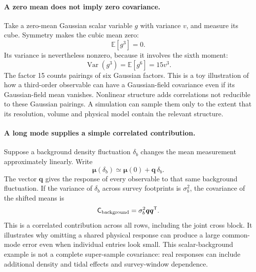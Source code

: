 \documentclass[11pt]{article}
\newcommand{\Cov}{\mathsf{C}}
\newcommand{\T}{^{\mathsf{T}}}
\newcommand{\E}{\mathbb{E}}
\newcommand{\Var}{\operatorname{Var}}
\begin{document}
\paragraph{A zero mean does not imply zero covariance.}
Take a zero-mean Gaussian scalar variable $g$ with variance $v$, and
measure its cube. Symmetry makes the cubic mean zero:
\begin{equation}
 \E[g^3]=0.
\end{equation}
Its variance is nevertheless nonzero, because it involves the sixth
moment:
\begin{equation}
 \Var(g^3)=\E[g^6]=15v^3.
\end{equation}
The factor 15 counts pairings of six Gaussian factors. This is a toy
illustration of how a third-order observable can have a Gaussian-field
covariance even if its Gaussian-field mean vanishes. Nonlinear structure
adds correlations not reducible to these Gaussian pairings. A simulation
can sample them only to the extent that its resolution, volume and physical
model contain the relevant structure.

\paragraph{A long mode supplies a simple correlated contribution.}
Suppose a background density fluctuation $\delta_b$ changes the mean
measurement approximately linearly. Write
\begin{equation}
 \boldsymbol\mu(\delta_b)
        \simeq\boldsymbol\mu(0)+\boldsymbol q\,\delta_b.
\end{equation}
The vector $\boldsymbol q$ gives the response of every observable to that
same background fluctuation. If the variance of $\delta_b$ across survey
footprints is $\sigma_b^2$, the covariance of the shifted means is
\begin{equation}
 \Cov_{\rm background}=\sigma_b^2\boldsymbol q\boldsymbol q\T.
\end{equation}
This is a correlated contribution across all rows, including the joint
cross block. It illustrates why omitting a shared physical response can
produce a large common-mode error even when individual entries look small.
This scalar-background example is not a complete super-sample covariance:
real responses can include additional density and tidal effects and
survey-window dependence.
\end{document}
